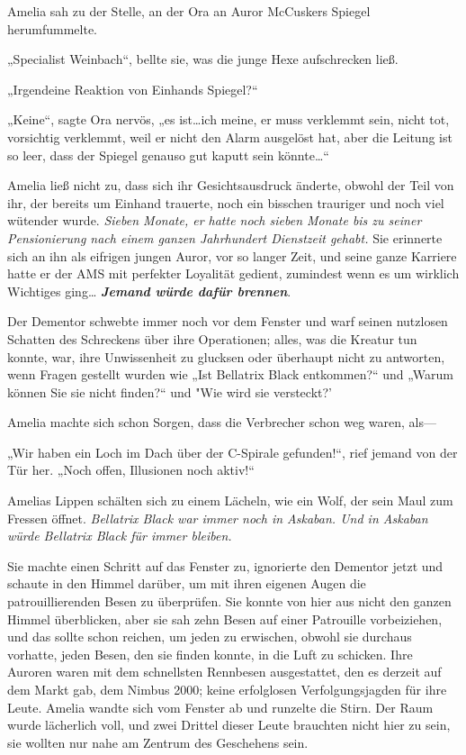 {Amelia sah zu der Stelle, an der Ora an Auror McCuskers Spiegel herumfummelte.

„Specialist Weinbach“, bellte sie, was die junge Hexe aufschrecken ließ.

„Irgendeine Reaktion von Einhands Spiegel?“

„Keine“, sagte Ora nervös, „es ist…ich meine, er muss verklemmt sein, nicht tot, vorsichtig verklemmt, weil er nicht den Alarm ausgelöst hat, aber die Leitung ist so leer, dass der Spiegel genauso gut kaputt sein könnte…“

Amelia ließ nicht zu, dass sich ihr Gesichtsausdruck änderte, obwohl der Teil von ihr, der bereits um Einhand trauerte, noch ein bisschen trauriger und noch viel wütender wurde. \emph{Sieben Monate, er hatte noch sieben Monate bis zu seiner Pensionierung nach einem ganzen Jahrhundert Dienstzeit gehabt.} Sie erinnerte sich an ihn als eifrigen jungen Auror, vor so langer Zeit, und seine ganze Karriere hatte er der AMS mit perfekter Loyalität gedient, zumindest wenn es um wirklich Wichtiges ging… \textbf{\emph{Jemand würde dafür brennen}}.

Der Dementor schwebte immer noch vor dem Fenster und warf seinen nutzlosen Schatten des Schreckens über ihre Operationen; alles, was die Kreatur tun konnte, war, ihre Unwissenheit zu glucksen oder überhaupt nicht zu antworten, wenn Fragen gestellt wurden wie „Ist Bellatrix Black entkommen?“ und „Warum können Sie sie nicht finden?“ und "Wie wird sie versteckt?'

Amelia machte sich schon Sorgen, dass die Verbrecher schon weg waren, als—

„Wir haben ein Loch im Dach über der C-Spirale gefunden!“, rief jemand von der Tür her. „Noch offen, Illusionen noch aktiv!“

Amelias Lippen schälten sich zu einem Lächeln, wie ein Wolf, der sein Maul zum Fressen öffnet. \emph{Bellatrix Black war immer noch in Askaban. Und in Askaban würde Bellatrix Black für immer bleiben.}

Sie machte einen Schritt auf das Fenster zu, ignorierte den Dementor jetzt und schaute in den Himmel darüber, um mit ihren eigenen Augen die patrouillierenden Besen zu überprüfen. Sie konnte von hier aus nicht den ganzen Himmel überblicken, aber sie sah zehn Besen auf einer Patrouille vorbeiziehen, und das sollte schon reichen, um jeden zu erwischen, obwohl sie durchaus vorhatte, jeden Besen, den sie finden konnte, in die Luft zu schicken. Ihre Auroren waren mit dem schnellsten Rennbesen ausgestattet, den es derzeit auf dem Markt gab, dem Nimbus 2000; keine erfolglosen Verfolgungsjagden für ihre Leute. Amelia wandte sich vom Fenster ab und runzelte die Stirn. Der Raum wurde lächerlich voll, und zwei Drittel dieser Leute brauchten nicht hier zu sein, sie wollten nur nahe am Zentrum des Geschehens sein.

}
